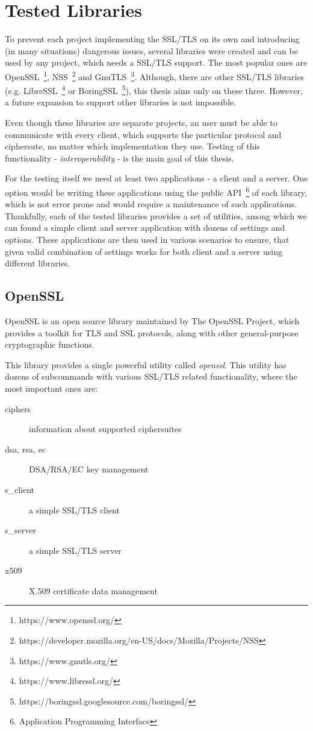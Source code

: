 \section{Tested Libraries}
    To prevent each project implementing the SSL/TLS on its own and introducing
    (in many situations) dangerous issues, several libraries were created and
    can be used by any project, which needs a SSL/TLS support. The most
    popular ones are OpenSSL~\footnote{https://www.openssl.org/},
    NSS~\footnote{https://developer.mozilla.org/en-US/docs/Mozilla/Projects/NSS}
    and GnuTLS~\footnote{https://www.gnutls.org/}. Although, there are other
    SSL/TLS libraries (e.g. LibreSSL~\footnote{https://www.libressl.org/} or
    BoringSSL~\footnote{https://boringssl.googlesource.com/boringssl/}),
    this thesis aims only on these three. However, a future
    expansion to support other libraries is not impossible.

    Even though these libraries are
    separate projects, an user must be able to communicate with every client,
    which supports the particular protocol and ciphersute, no matter which
    implementation they use. Testing of this functionality - \textit{interoperability} -
    is the main goal of this thesis.

    For the testing itself we need at least two applications - a client and a server.
    One option would be writing these applications using the public
    API~\footnote{Application Programming Interface} of each library,
    which is not error prone and would require a maintenance of such applications.
    Thankfully, each of the tested libraries provides a set of utilities,
    among which we can found a simple client and server application with
    dozens of settings and options. These applications are then used in
    various scenarios to ensure, that given valid combination of settings works
    for both client and a server using different libraries.

\subsection{OpenSSL}
    OpenSSL is an open source library maintained by The OpenSSL Project,
    which provides a toolkit for TLS and SSL
    protocols, along with other general-purpose cryptographic functions.

    This library provides a single powerful utility called \textit{openssl}. This
    utility has dozens of subcommands with various SSL/TLS related functionality,
    where the most important ones are:
    \begin{description}
        \item [ciphers] information about supported ciphersuites
        \item [dsa, rsa, ec] DSA/RSA/EC key management
        \item [s\_client] a simple SSL/TLS client
        \item [s\_server] a simple SSL/TLS server
        \item [x509] X.509 certificate data management
    \end{description}


